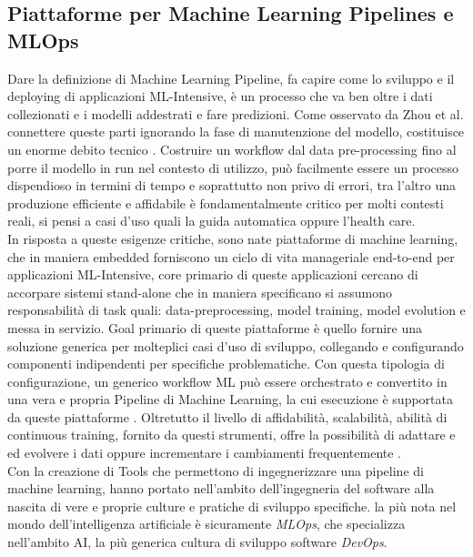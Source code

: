\subsection{Piattaforme per Machine Learning Pipelines e MLOps}
Dare la definizione di Machine Learning Pipeline, fa capire come lo sviluppo e il deploying di applicazioni ML-Intensive, è un processo che va ben oltre i dati collezionati e i modelli addestrati e fare predizioni. Come osservato da Zhou et al. connettere queste parti ignorando la fase di manutenzione del modello, costituisce un enorme debito tecnico \cite{MLOps}. Costruire un workflow dal data pre-processing fino al porre il modello in run nel contesto di utilizzo, può facilmente essere un processo dispendioso in termini di tempo e soprattutto non privo di errori, tra l'altro una produzione efficiente e affidabile è fondamentalmente critico per molti contesti reali, si pensi a casi d'uso quali la guida automatica oppure l'health care\cite{MLOps}. \\

In risposta a queste esigenze critiche, sono nate piattaforme di machine learning, che in maniera embedded forniscono un ciclo di vita manageriale end-to-end per applicazioni ML-Intensive, core primario di queste applicazioni cercano di accorpare sistemi stand-alone che in maniera specificano si assumono responsabilità di task quali: data-preprocessing, model training, model evolution e messa in servizio. Goal primario di queste piattaforme è quello fornire una soluzione generica per molteplici casi d'uso di sviluppo, collegando e configurando componenti indipendenti per specifiche problematiche. Con questa tipologia di configurazione, un generico workflow ML può essere orchestrato e convertito in una vera e propria Pipeline di Machine Learning, la cui esecuzione è supportata da queste piattaforme \cite{MLOps}. Oltretutto il livello di affidabilità, scalabilità, abilità di continuous training, fornito da questi strumenti, offre la possibilità di adattare e ed evolvere i dati oppure incrementare i cambiamenti frequentemente \cite{MLOps}.\\

Con la creazione di Tools che permettono di ingegnerizzare una pipeline di machine learning, hanno portato nell'ambito dell'ingegneria del software alla nascita di vere e proprie culture e pratiche di sviluppo specifiche. la più nota nel mondo dell'intelligenza artificiale è sicuramente \emph{MLOps}, che specializza nell'ambito AI, la più generica cultura di sviluppo software \emph{DevOps}. 

